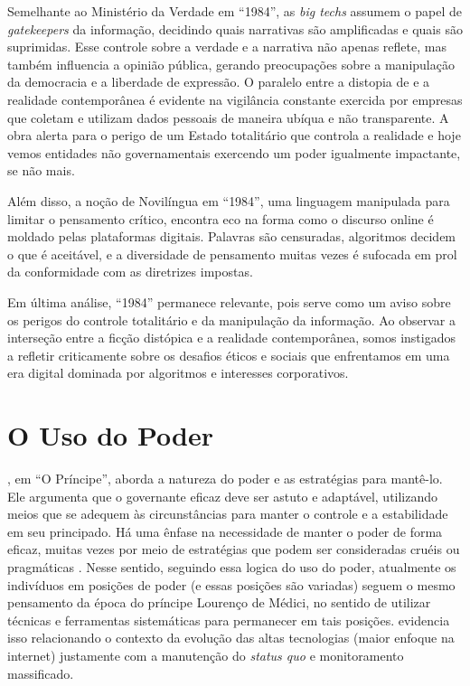 \documentclass[
	12pt,
	openright,
	twoside,
	a4paper,
	english,
	french,
	spanish,
	brazil
]{abntex2}
\begin{document}
  Semelhante ao Ministério da Verdade em ``1984'', as \textit{big techs} assumem
  o papel de \textit{gatekeepers} da informação, decidindo quais narrativas são
  amplificadas e quais são suprimidas. Esse controle sobre a verdade e a
  narrativa não apenas reflete, mas também influencia a opinião pública, gerando
  preocupações sobre a manipulação da democracia e a liberdade de expressão. O
  paralelo entre a distopia de  e a realidade
  contemporânea é evidente na vigilância constante exercida por empresas que
  coletam e utilizam dados pessoais de maneira ubíqua e não transparente. A obra
  alerta para o perigo de um Estado totalitário que controla a realidade e hoje
  vemos entidades não governamentais exercendo um poder igualmente impactante,
  se não mais.

  Além disso, a noção de Novilíngua em ``1984'', uma linguagem manipulada para
  limitar o pensamento crítico, encontra eco na forma como o discurso online é
  moldado pelas plataformas digitais. Palavras são censuradas, algoritmos
  decidem o que é aceitável, e a diversidade de pensamento muitas vezes é
  sufocada em prol da conformidade com as diretrizes impostas.

  Em última análise, ``1984'' permanece relevante, pois serve como um aviso
  sobre os perigos do controle totalitário e da manipulação da informação. Ao
  observar a interseção entre a ficção distópica e a realidade contemporânea,
  somos instigados a refletir criticamente sobre os desafios éticos e sociais
  que enfrentamos em uma era digital dominada por algoritmos e interesses
  corporativos.


  \section{O Uso do Poder}

  , em ``O Príncipe'', aborda a natureza do
  poder e as estratégias para mantê-lo. Ele argumenta que o governante eficaz
  deve ser astuto e adaptável, utilizando meios que se adequem às circunstâncias
  para manter o controle e a estabilidade em seu principado. Há uma ênfase na
  necessidade de manter o poder de forma eficaz, muitas vezes por meio de
  estratégias que podem ser consideradas cruéis ou pragmáticas
  \cite{maquiavel-principe}. Nesse sentido, seguindo essa logica do uso do
  poder, atualmente os indivíduos em posições de poder (e essas posições são
  variadas) seguem o mesmo pensamento da época do príncipe Lourenço de Médici,
  no sentido de utilizar técnicas e ferramentas sistemáticas para permanecer em
  tais posições.  evidencia isso
  relacionando o contexto da evolução das altas tecnologias (maior enfoque na
  internet) justamente com a manutenção do \textit{status quo} e monitoramento
  massificado.
\end{document}
